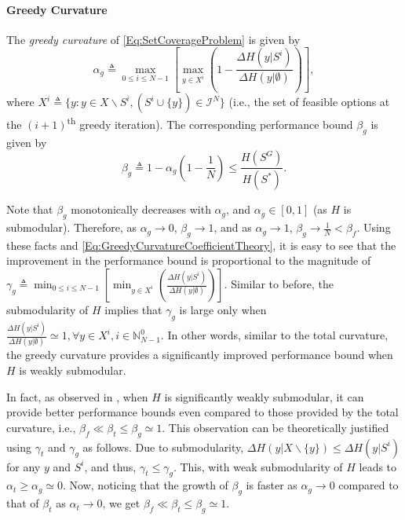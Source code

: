 \documentclass[letterpaper, 10 pt, conference]{ieeeconf}
\newcommand{\N}{\mathbb{N}}
\newcommand{\tsup}[1]{\textsuperscript{#1}}
\begin{document}
\paragraph{\textbf{Greedy Curvature \cite{Conforti1984}}}
The \emph{greedy curvature} of \eqref{Eq:SetCoverageProblem} is given by   
\begin{equation}\label{Eq:GreedyCurvatureCoefficientTheory}
    \alpha_g \triangleq \max_{0 \leq i \leq N-1} \left[ \max_{y \in X^i}\left(1 - \frac{\Delta H(y\vert S^i)}{\Delta H(y\vert \emptyset)}\right) \right],
\end{equation}
where $X^i \triangleq \{y: y \in X \backslash S^i, (S^i \cup \{y\}) \in \mathcal{I}^N\}$ (i.e., the set of feasible options at the $(i+1)$\tsup{th} greedy iteration). The corresponding performance bound $\beta_g$ is given by  
\begin{equation}\label{Eq:GreedyCurvatureBoundTheory}
    \beta_g \triangleq 1-\alpha_g\left(1-\frac{1}{N}\right) \leq \frac{H(S^G)}{H(S^*)}. 
\end{equation}

Note that $\beta_g$ monotonically decreases with $\alpha_g$, and $\alpha_g \in [0,1]$ (as $H$ is submodular). Therefore, as $\alpha_g \rightarrow 0$, $\beta_g \rightarrow 1$, and as $\alpha_g \rightarrow 1$, $\beta_g \rightarrow \frac{1}{N} < \beta_f$. Using these facts and \eqref{Eq:GreedyCurvatureCoefficientTheory}, it is easy to see that the improvement in the performance bound is proportional to the magnitude of 
$ %
\gamma_g \triangleq \min_{0 \leq i \leq N-1} \left[ \min_{y \in X^i}\left(\frac{\Delta H(y\vert S^i)}{\Delta H(y\vert \emptyset)}\right) \right].
$ %
Similar to before, the submodularity of $H$ implies that $\gamma_g$ is large only when 
$\frac{\Delta H(y\vert S^i)}{\Delta H(y\vert \emptyset)} \simeq 1, \forall y\in X^i, i\in \N_{N-1}^0$. 
In other words, similar to the total curvature, the greedy curvature provides a significantly improved performance bound when $H$ is weakly submodular. 

In fact, as observed in \cite{Sun2020}, when $H$ is significantly weakly submodular, it can provide better performance bounds even compared to those provided by the total curvature, i.e., $\beta_f \ll \beta_t \leq \beta_g \simeq 1$. This observation can be theoretically justified using $\gamma_t$ and $\gamma_g$ as follows. Due to submodularity, $\Delta H(y \vert X \backslash \{y\}) \leq \Delta H(y\vert S^i)$ for any $y$ and $S^i$, and thus, $\gamma_t \leq \gamma_g$. This, with weak submodularity of $H$ leads to $\alpha_t \geq \alpha_g \simeq 0$. Now, noticing that the growth of $\beta_g$ is faster as $\alpha_g \rightarrow 0$ compared to that of $\beta_t$ as $\alpha_t \rightarrow 0$, we get $\beta_f \ll \beta_t \leq \beta_g \simeq 1$.
\end{document}
